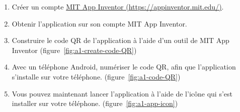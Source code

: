 \begin{enumerate}
    \item Créer un compte \href{https://appinventor.mit.edu/}{MIT App Inventor (https://appinventor.mit.edu/)}.
    \item Obtenir l’application sur son compte MIT App Inventor.
    \item Construire le code QR de l’application à l’aide d’un outil de MIT App Inventor (figure~\ref{fig:a1-create-code-QR})
    \item Avec un téléphone Android, numériser le code QR, afin que l’application s’installe sur votre téléphone. (figure~\ref{fig:a1-code-QR})
    \item Vous pouvez maintenant lancer l’application à l’aide de l’icône qui s’est installer sur votre téléphone. (figure~\ref{fig:a1-app-icon})
\end{enumerate}

